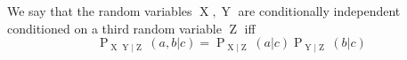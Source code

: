 We say that the random variables $\operatorname{X}, \operatorname{Y}$ are conditionally independent conditioned on a third random variable $\operatorname{Z}$ iff
$$\operatorname{P}_{\operatorname{X} \operatorname{Y} |\operatorname{Z}}(a, b | c) = \operatorname{P}_{\operatorname{X} | \operatorname{Z}}(a | c) \operatorname{P}_{\operatorname{Y} | \operatorname{Z}}(b | c)$$ 
